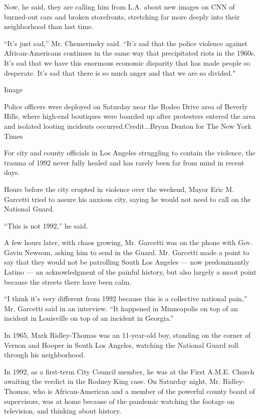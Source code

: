 Now, he said, they are calling him from L.A. about new images on CNN of
burned-out cars and broken storefronts, stretching far more deeply into
their neighborhood than last time.

``It's just sad,'' Mr. Chemerinsky said. ``It's sad that the police
violence against African-Americans continues in the same way that
precipitated riots in the 1960s. It's sad that we have this enormous
economic disparity that has made people so desperate. It's sad that
there is so much anger and that we are so divided."

Image

Police officers were deployed on Saturday near the Rodeo Drive area of
Beverly Hills, where high-end boutiques were boarded up after protesters
entered the area and isolated looting incidents occurred.Credit...Bryan
Denton for The New York Times

For city and county officials in Los Angeles struggling to contain the
violence, the trauma of 1992 never fully healed and has rarely been far
from mind in recent days.

Hours before the city erupted in violence over the weekend, Mayor Eric
M. Garcetti tried to assure his anxious city, saying he would not need
to call on the National Guard.

``This is not 1992,'' he said.

A few hours later, with chaos growing, Mr. Garcetti was on the phone
with Gov. Gavin Newsom, asking him to send in the Guard. Mr. Garcetti
made a point to say that they would not be patrolling South Los Angeles
--- now predominantly Latino --- an acknowledgment of the painful
history, but also largely a moot point because the streets there have
been calm.

``I think it's very different from 1992 because this is a collective
national pain,'' Mr. Garcetti said in an interview. ``It happened in
Minneapolis on top of an incident in Louisville on top of an incident in
Georgia.''

In 1965, Mark Ridley-Thomas was an 11-year-old boy, standing on the
corner of Vernon and Hooper in South Los Angeles, watching the National
Guard roll through his neighborhood.

In 1992, as a first-term City Council member, he was at the First A.M.E.
Church awaiting the verdict in the Rodney King case. On Saturday night,
Mr. Ridley-Thomas, who is African-American and a member of the powerful
county board of supervisors, was at home because of the pandemic
watching the footage on television, and thinking about history.

